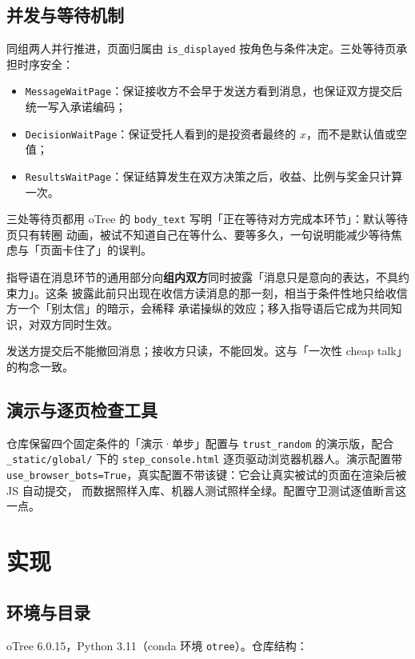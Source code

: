 \documentclass[10pt,a4paper]{ctexart}
\newcommand{\code}[1]{\texttt{#1}}
\begin{document}
\subsection{并发与等待机制}

同组两人并行推进，页面归属由 \code{is\_displayed} 按角色与条件决定。三处等待页承担时序安全：

\begin{itemize}
  \item \code{MessageWaitPage}：保证接收方不会早于发送方看到消息，也保证双方提交后统一写入承诺编码；
  \item \code{DecisionWaitPage}：保证受托人看到的是投资者最终的 $x$，而不是默认值或空值；
  \item \code{ResultsWaitPage}：保证结算发生在双方决策之后，收益、比例与奖金只计算一次。
\end{itemize}

三处等待页都用 oTree 的 \code{body\_text} 写明「正在等待对方完成本环节」：默认等待页只有转圈
动画，被试不知道自己在等什么、要等多久，一句说明能减少等待焦虑与「页面卡住了」的误判。

指导语在消息环节的通用部分向\textbf{组内双方}同时披露「消息只是意向的表达，不具约束力」。这条
披露此前只出现在收信方读消息的那一刻，相当于条件性地只给收信方一个「别太信」的暗示，会稀释
承诺操纵的效应；移入指导语后它成为共同知识，对双方同时生效。

发送方提交后不能撤回消息；接收方只读，不能回发。这与「一次性 cheap talk」的构念一致。

\subsection{演示与逐页检查工具}

仓库保留四个固定条件的「演示·单步」配置与 \code{trust\_random} 的演示版，配合
\code{\_static/global/} 下的 \code{step\_console.html} 逐页驱动浏览器机器人。演示配置带
\code{use\_browser\_bots=True}，真实配置不带该键：它会让真实被试的页面在渲染后被 JS 自动提交，
而数据照样入库、机器人测试照样全绿。配置守卫测试逐值断言这一点。

\section{实现}

\subsection{环境与目录}

oTree 6.0.15，Python 3.11（conda 环境 \code{otree}）。仓库结构：
\end{document}
